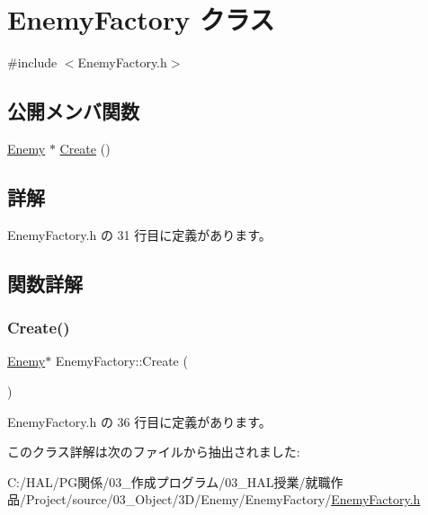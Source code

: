 \hypertarget{class_enemy_factory}{}\section{Enemy\+Factory クラス}
\label{class_enemy_factory}


{\ttfamily \#include $<$Enemy\+Factory.\+h$>$}

\subsection*{公開メンバ関数}
\begin{DoxyCompactItemize}
\item 
\mbox{\hyperlink{class_enemy}{Enemy}} $\ast$ \mbox{\hyperlink{class_enemy_factory_a74729ede6a5f0e1cbdf3215a052e314a}{Create}} ()
\end{DoxyCompactItemize}


\subsection{詳解}


 Enemy\+Factory.\+h の 31 行目に定義があります。



\subsection{関数詳解}
\mbox{\label{class_enemy_factory_a74729ede6a5f0e1cbdf3215a052e314a}} 
\subsubsection{\texorpdfstring{Create()}{Create()}}
{\footnotesize\ttfamily \mbox{\hyperlink{class_enemy}{Enemy}}$\ast$ Enemy\+Factory\+::\+Create (\begin{DoxyParamCaption}{ }\end{DoxyParamCaption})\hspace{0.3cm}{\ttfamily [inline]}}



 Enemy\+Factory.\+h の 36 行目に定義があります。



このクラス詳解は次のファイルから抽出されました\+:\begin{DoxyCompactItemize}
\item 
C\+:/\+H\+A\+L/\+P\+G関係/03\+\_\+作成プログラム/03\+\_\+\+H\+A\+L授業/就職作品/\+Project/source/03\+\_\+\+Object/3\+D/\+Enemy/\+Enemy\+Factory/\mbox{\hyperlink{_enemy_factory_8h}{Enemy\+Factory.\+h}}\end{DoxyCompactItemize}
